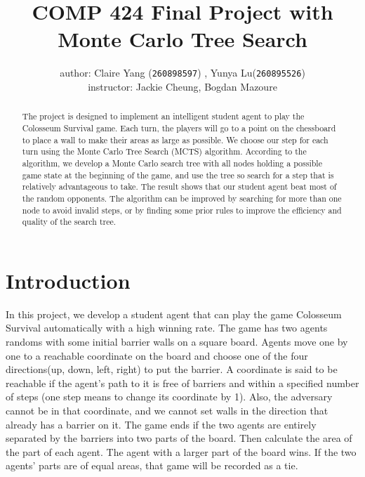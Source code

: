 \documentclass[twoside,11pt]{article}
\begin{document}
\title{COMP 424 Final Project with Monte Carlo Tree Search}
\author{author: Claire Yang (\texttt{260898597}) , Yunya Lu(\texttt{260895526}) \\ instructor: Jackie Cheung, Bogdan Mazoure\\}



\maketitle


\begin{abstract}
The project is designed to implement an intelligent student agent to play the Colosseum Survival game. Each turn, the players will go to a point on the chessboard to place a wall to make their areas as large as possible. We choose our step for each turn using the Monte Carlo Tree Search (MCTS) algorithm. According to the algorithm, we develop a Monte Carlo search tree with all nodes holding a possible game state at the beginning of the game, and use the tree so search for a step that is relatively advantageous to take. The result shows that our student agent beat most of the random opponents. The algorithm can be improved by searching for more than one node to avoid invalid steps, or by finding some prior rules to improve the efficiency and quality of the search tree.

\end{abstract}
\section{Introduction}
In this project, we develop a student agent that can play the game Colosseum Survival automatically with a high winning rate. The game has two agents randoms with some initial barrier walls on a square board. Agents move one by one to a reachable coordinate on the board and choose one of the four directions(up, down, left, right) to put the barrier. A coordinate is said to be reachable if the agent's path to it is free of barriers and within a specified number of steps (one step means to change its coordinate by 1). Also, the adversary cannot be in that coordinate, and we cannot set walls in the direction that already has a barrier on it. The game ends if the two agents are entirely separated by the barriers into two parts of the board. Then calculate the area of the part of each agent. The agent with a larger part of the board wins. If the two agents' parts are of equal areas, that game will be recorded as a tie.
\end{document}
